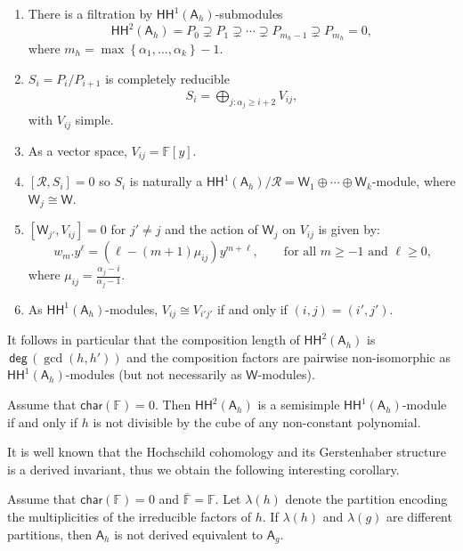 \documentclass{commat}
\newcommand{\FF}{\mathbb{F}}
\newcommand{\A}{\mathsf{A}}
\newcommand{\W}{\mathsf{W}}
\newcommand\chara{\mathsf {char}}
\newcommand\hoch{\mathsf{HH}}
\newcommand\degg{\, \mathsf{deg} \,}
\newcommand{\lb}[1]{\left[ #1\right]}
\newcommand{\pb}[1]{\left\{ #1\right\}}
\newcommand{\seq}[1]{\left( #1\right)}
\begin{document}
\begin{enumerate}%
	\item There is a filtration by $\hoch^1(\A_h)$-submodules
	\begin{equation*}
		\hoch^2(\A_h)=P_0\supsetneq P_1\supsetneq \cdots \supsetneq P_{m_h-1}\supsetneq P_{m_h}=0,
	\end{equation*}
	where $m_h=\max\pb{\alpha_1, \ldots, \alpha_k}-1$.
	\item $S_i=P_i/P_{i+1}$ is completely reducible
	\begin{align*}
		S_i= \bigoplus_{j:\alpha_j\geq i+2} {V}_{ij},
	\end{align*}
	with ${V}_{ij}$ simple.
	\item As a vector space, ${V}_{ij}=\FF[y]$.
	\item $\lb{\mathcal R, S_i}=0$ so $S_i$ is naturally a 
	$\hoch^1(\A_h)/\mathcal{R}=\W_1\oplus\cdots\oplus\W_k$-module, where $\W_j\cong\W$.
	\item $\lb{\W_{j'}, {V}_{ij}}=0$ for $j'\neq j$ and the action of $\W_j$ on ${V}_{ij}$ is given by:
	\begin{equation*}
		w_m . y^\ell =(\ell-(m+1)\mu_{ij})y^{m+\ell}, \qquad \mbox{for all $m\geq -1$ and $\ell\geq 0$,}
	\end{equation*}
	where $\mu_{ij}=\frac{\alpha_j-i}{\alpha_j-1}$.
	\item As $\hoch^1(\A_h)$-modules, ${V}_{ij}\cong {V}_{i'j'}$ if and only if $(i, j)=(i', j')$.
\end{enumerate}

It follows in particular that the composition length of $\hoch^2(\A_h)$ is $\degg\seq{\gcd(h, h')}$ and the composition factors are pairwise non-isomorphic as $\hoch^1(\A_h)$-modules (but not necessarily as $\W$-modules). 

\begin{theorem}
	Assume that $\chara(\FF)=0$.
	Then $\hoch^2(\A_h)$ is a semisimple $\hoch^1(\A_h)$-module if and only if $h$ is not divisible by the cube of any non-constant polynomial. 
\end{theorem}


It is well known that the Hochschild cohomology and its Gerstenhaber structure is a derived invariant, thus we obtain the following interesting corollary.

\begin{corollary}
	Assume that $\chara(\FF)=0$ and $\overline{\FF}=\FF$.
	Let $\lambda(h)$ denote the partition encoding the multiplicities of the irreducible factors of $h$. If $\lambda(h)$ and $\lambda(g)$ are different partitions, then $\A_{h}$ is not derived equivalent to $\A_{g}$. 
\end{corollary}
\end{document}
